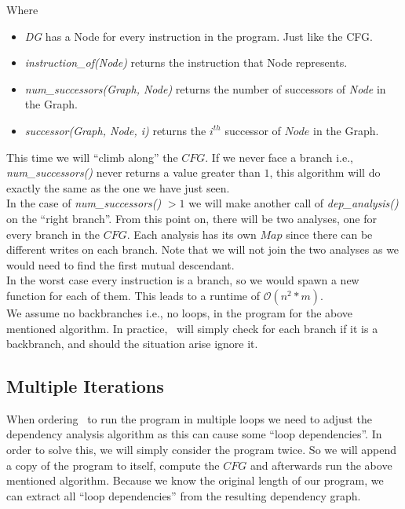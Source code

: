 Where
\begin{itemize}
    \item \emph{DG} has a Node for every instruction in the program. Just like the CFG.
    \item \emph{instruction\_of(Node)} returns the instruction that Node represents.
    \item \emph{num\_successors(Graph, Node)} returns the number of successors of \emph{Node} in the Graph.
    \item \emph{successor(Graph, Node, i)} returns the $i^{th}$ successor of $Node$ in the Graph.
\end{itemize}

This time we will ``climb along'' the $CFG$. If we never face a branch i.e., \emph{num\_successors()} never returns a value greater than $1$, this algorithm will do exactly the same as the one we have just seen.\\
In the case of \emph{num\_successors()} $> 1$ we will make another call of \emph{dep\_analysis()} on the ``right branch''. From this point on, there will be two analyses, one for every branch in the $CFG$. Each analysis has its own $Map$ since there can be different writes on each branch. Note that we will not join the two analyses as we would need to find the first mutual descendant.\\
In the worst case every instruction is a branch, so we would spawn a new function for each of them. This leads to a runtime of $\mathcal{O}(n^2*m)$.\\

We assume no backbranches i.e., no loops, in the program for the above mentioned algorithm. In practice, \suaca\ will simply check for each branch if it is a backbranch, and should the situation arise ignore it.


\subsection{Multiple Iterations}

When ordering \suaca\ to run the program in multiple loops we need to adjust the dependency analysis algorithm as this can cause some ``loop dependencies''. In order to solve this, we will simply consider the program twice. So we will append a copy of the program to itself, compute the $CFG$ and afterwards run the above mentioned algorithm. Because we know the original length of our program, we can extract all ``loop dependencies'' from the resulting dependency graph.


